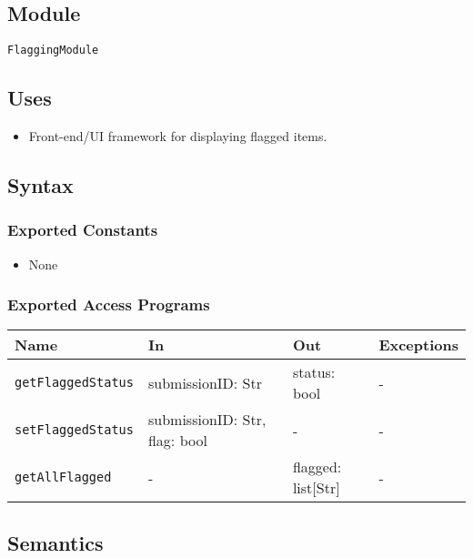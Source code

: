 \documentclass[12pt, titlepage]{article}
\begin{document}
\subsection{Module}

\texttt{FlaggingModule}

\subsection{Uses}

\begin{itemize}
    \item Front-end/UI framework for displaying flagged items.
\end{itemize}

\subsection{Syntax}

\subsubsection{Exported Constants}

\begin{itemize}
    \item None
\end{itemize}

\subsubsection{Exported Access Programs}

\begin{center}
\begin{tabular}{p{5cm} p{3.5cm} p{3.5cm} p{2cm}}
\hline
\textbf{Name} & \textbf{In} & \textbf{Out} & \textbf{Exceptions} \\
\hline
\texttt{getFlaggedStatus} & submissionID: Str & status: bool & - \\
\texttt{setFlaggedStatus} & submissionID: Str, flag: bool & - & - \\
\texttt{getAllFlagged} & - & flagged: list[Str] & - \\
\hline
\end{tabular}
\end{center}

\subsection{Semantics}
\end{document}
